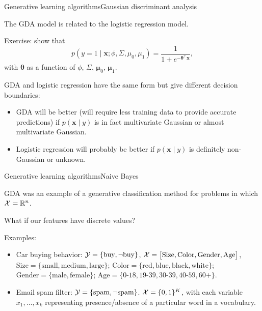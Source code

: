\documentclass{beamer}
\renewcommand{\vec}[1]{\boldsymbol{#1}}
\def\Rset{\mathbb{R}}
\begin{document}
\begin{frame}{Generative learning algorithms}{Gaussian discriminant analysis}

  The GDA model is related to the logistic regression model.

  \medskip

  Exercise: show that
  \[ p(y=1 \mid \vec{x} ; \phi, \Sigma, \mu_0, \mu_1) =
  \frac{1}{1+e^{-\vec{\theta}^\top \vec{x}}}, \]
  with $\vec{\theta}$ as a function of $\phi$, $\Sigma$, $\vec{\mu}_0$,
  $\vec{\mu}_1$.

  \medskip

  GDA and logistic regression have the same form but give different decision boundaries:
  \begin{itemize}
  \item GDA will be better (will require less training data to provide
    accurate predictions) if $p(\vec{x} \mid y)$ is in fact
    multivariate Gaussian or almost multivariate Gaussian.
  \item Logistic regression will probably be better if $p(\vec{x} \mid
    y)$ is definitely non-Gaussian or unknown.
  \end{itemize}
    
\end{frame}


\begin{frame}{Generative learning algorithms}{Naive Bayes}

  GDA was an example of a generative classification method for
  problems in which ${\cal X} = \Rset^n$.

  \medskip

  What if our features have \alert{discrete} values?

  \medskip

  Examples:
  \begin{itemize}
  \item Car buying behavior: ${\cal Y} = \{ \text{buy}, \neg\text{buy}
    \}$, ${\cal X} = \begin{bmatrix} \text{Size}, \text{Color},
      \text{Gender}, \text{Age} \end{bmatrix}$, $\text{Size} = \{
    \text{small}, \text{medium}, \text{large} \}$; $\text{Color} = \{
    \text{red}, \text{blue}, \text{black}, \text{white} \}$;
    $\text{Gender} = \{ \text{male}, \text{female} \}$; $\text{Age} =
    \{ \text{0-18}, \text{19-39}, \text{30-39}, \text{40-59},
    \text{60+} \}$.
    \item Email spam filter: ${\cal Y} = \{ \text{spam},
      \neg\text{spam} \}$. ${\cal X} = \{0,1\}^K$, with each variable
      $x_1,\ldots,x_k$ representing presence/absence of a particular
      word in a \alert{vocabulary}.
  \end{itemize}
  
\end{frame}
\end{document}
